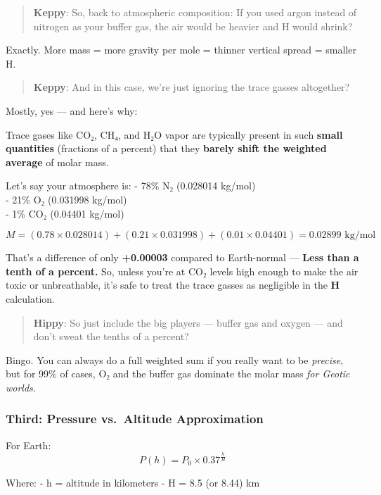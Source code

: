 \documentclass[
  letterpaper,
]{book}
\begin{document}
\begin{quote}
\textbf{Keppy}: So, back to atmospheric composition: If you used argon
instead of nitrogen as your buffer gas, the air would be heavier and H
would shrink?
\end{quote}

Exactly. More mass = more gravity per mole = thinner vertical spread =
smaller H.

\begin{quote}
\textbf{Keppy}: And in this case, we're just ignoring the trace gasses
altogether?
\end{quote}

Mostly, yes --- and here's why:

Trace gases like CO₂, CH₄, and H₂O vapor are typically present in such
\textbf{small quantities} (fractions of a percent) that they
\textbf{barely shift the weighted average} of molar mass.

Let's say your atmosphere is: - 78\% N₂ (0.028014 kg/mol)\\
- 21\% O₂ (0.031998 kg/mol)\\
- 1\% CO₂ (0.04401 kg/mol)

\[
M = (0.78 \times 0.028014) + (0.21 \times 0.031998) + (0.01 \times 0.04401) = 0.02899 \text{ kg/mol}​
\]

That's a difference of only \textbf{+0.00003} compared to Earth-normal
--- \textbf{Less than a tenth of a percent.} So, unless you're at CO₂
levels high enough to make the air toxic or unbreathable, it's safe to
treat the trace gasses as negligible in the \textbf{H} calculation.

\begin{quote}
\textbf{Hippy}: So just include the big players --- buffer gas and
oxygen --- and don't sweat the tenths of a percent?
\end{quote}

Bingo. You can always do a full weighted sum if you really want to be
\emph{precise}, but for 99\% of cases, O₂ and the buffer gas dominate
the molar mass \emph{for Geotic worlds}.

\subsubsection{Third: Pressure vs.~Altitude
Approximation}\label{third-pressure-vs.-altitude-approximation}

For Earth: \[
P(h) = P_0 \times 0.37^{\frac{h}{H}}
\]

Where: - h = altitude in kilometers - H = 8.5 (or 8.44) km
\end{document}
